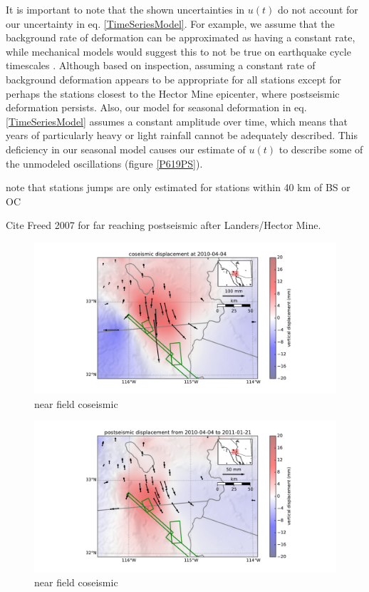 \documentclass[12pt]{article}
\begin{document}
It is important to note that the shown uncertainties in $u(t)$ do not account for our uncertainty in eq. \ref{TimeSeriesModel}.  For example, we assume that the background rate of deformation can be approximated as having a constant rate, while mechanical models would suggest this to not be true on earthquake cycle timescales \cite{Thatcher1983}. Although based on inspection,  assuming a constant rate of background deformation appears to be appropriate for all stations except for perhaps the stations closest to the Hector Mine epicenter, where postseismic deformation persists.  Also, our model for seasonal deformation in eq. \ref{TimeSeriesModel} assumes a constant amplitude over time, which means that years of particularly heavy or light rainfall cannot be adequately described.  This deficiency in our seasonal model causes our estimate of $u(t)$ to describe some of the unmodeled oscillations (figure \ref{P619PS}).          

note that stations jumps are only estimated for stations within 40 km of BS or OC



         


Cite Freed 2007 for far reaching postseismic after Landers/Hector Mine.

\begin{figure}
\includegraphics[scale=0.6]{Figures/near_field_data_1}
\centering 
\caption{near field coseismic}
\label{nearfield1}
\end{figure}

\begin{figure}
\includegraphics[scale=0.6]{Figures/near_field_data_2}
\centering 
\caption{near field coseismic}
\label{nearfield2}
\end{figure}
\end{document}

